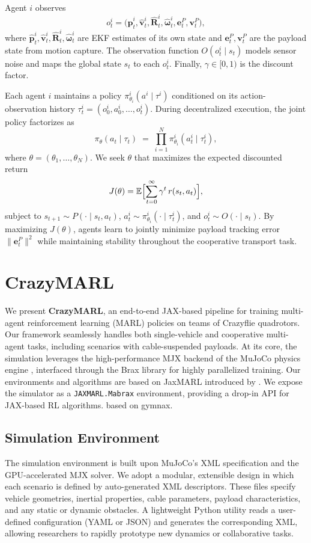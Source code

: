 Agent $i$ observes 
\[
o^i_t = \bigl(\hat{\mathbf{p}}^i_t,\hat{\mathbf{v}}^i_t,\hat{\mathbf{R}}^i_t,\hat{\boldsymbol{\omega}}^i_t,\mathbf{e}^P_t,\mathbf{v}^P_t\bigr),
\]
where $\hat{\mathbf{p}}^i_t,\hat{\mathbf{v}}^i_t,\hat{\mathbf{R}}^i_t,\hat{\boldsymbol{\omega}}^i_t$ are EKF estimates of its own state and $\mathbf{e}^P_t,\mathbf{v}^P_t$ are the payload state from motion capture. The observation function $O(o^i_t \mid s_t)$ models sensor noise and maps the global state $s_t$ to each $o^i_t$. Finally, $\gamma \in [0,1)$ is the discount factor.

Each agent $i$ maintains a policy $\pi^i_{\theta_i}(a^i \mid \tau^i)$ conditioned on its action-observation history $\tau^i_t = (o^i_0,a^i_0,\dots,o^i_t)$. During decentralized execution, the joint policy factorizes as
\[
\pi_\theta(a_t \mid \tau_t) \;=\; \prod_{i=1}^N \pi^i_{\theta_i}(a^i_t \mid \tau^i_t),
\]
where $\theta=(\theta_1,\dots,\theta_N)$. We seek $\theta$ that maximizes the expected discounted return
\[
J(\theta) = \mathbb{E}\Bigl[\sum_{t=0}^\infty \gamma^t\,r(s_t,a_t)\Bigr],
\]
subject to $s_{t+1}\sim P(\cdot\mid s_t,a_t)$, $a^i_t\sim \pi^i_{\theta_i}(\cdot\mid \tau^i_t)$, and $o^i_t\sim O(\cdot\mid s_t)$. By maximizing $J(\theta)$, agents learn to jointly minimize payload tracking error $\|\mathbf{e}^P_t\|^2$ while maintaining stability throughout the cooperative transport task.
\section{CrazyMARL}
We present \textbf{CrazyMARL}, an end-to-end JAX-based pipeline for training multi-agent reinforcement learning (MARL) policies on teams of Crazyflie quadrotors. Our framework seamlessly handles both single-vehicle and cooperative multi-agent tasks, including scenarios with cable-suspended payloads. At its core, the simulation leverages the high-performance MJX backend of the MuJoCo physics engine \cite{todorov_mujoco_2012}, interfaced through the Brax library for highly parallelized training. Our environments and algorithms are based on JaxMARL introduced by \autocite{flair2023jaxmarl}. We expose the simulator as a \texttt{JAXMARL.Mabrax} environment, providing a drop-in API for JAX-based RL algorithms.
\autocite{gymnax2022github} based on gymnax.
\subsection{Simulation Environment}
The simulation environment is built upon MuJoCo's XML specification and the GPU-accelerated MJX solver. We adopt a modular, extensible design in which each scenario is defined by auto-generated XML descriptors. These files specify vehicle geometries, inertial properties, cable parameters, payload characteristics, and any static or dynamic obstacles. A lightweight Python utility reads a user-defined configuration (YAML or JSON) and generates the corresponding XML, allowing researchers to rapidly prototype new dynamics or collaborative tasks. 
